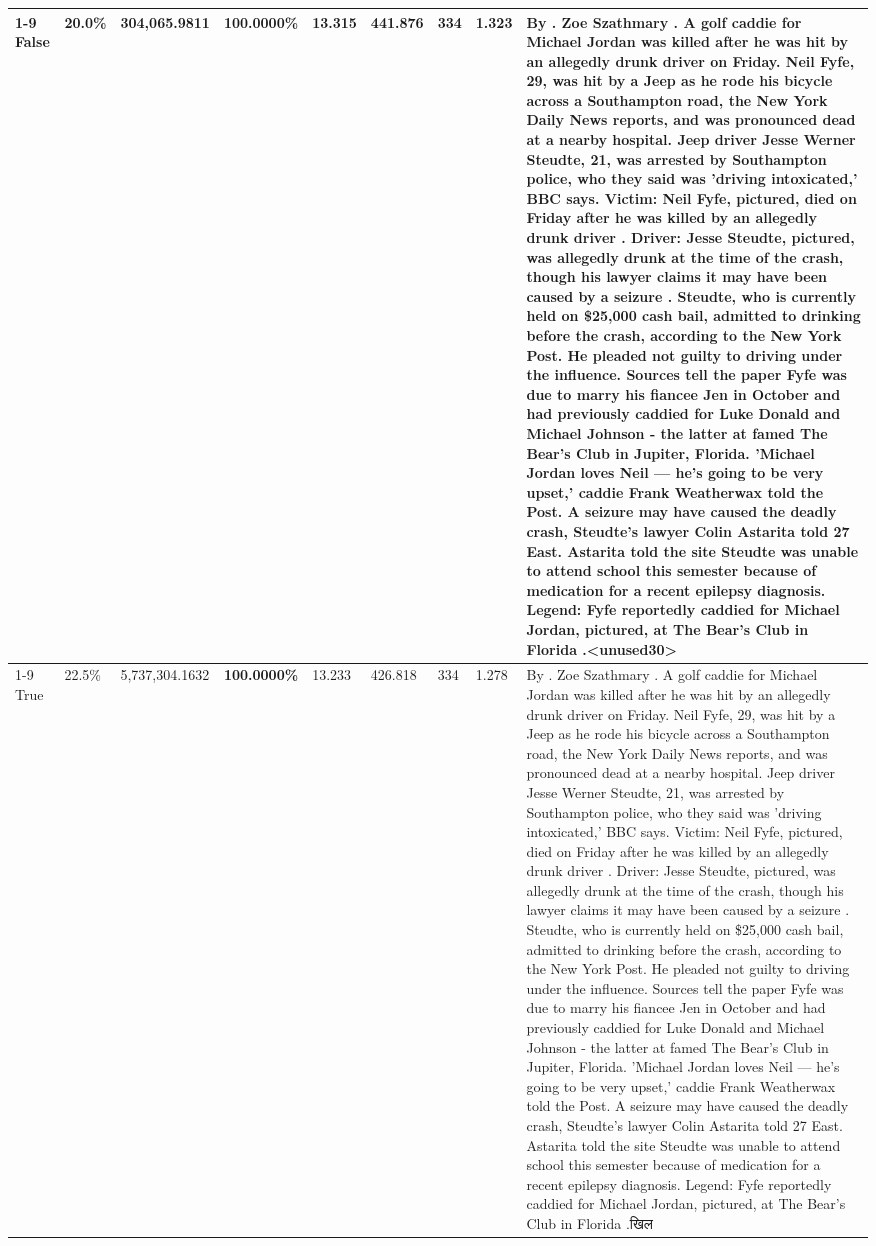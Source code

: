 \begin{table}[H]
\begin{tabular}{lllrlllll}
\cline{1-9}
False & 20.0\% & 304,065.9811 & \bfseries \color{red} 100.0000\% & 13.315 & 441.876 & 334 & 1.323 & By . Zoe Szathmary . A golf caddie for Michael Jordan was killed after he was hit by an allegedly drunk driver on Friday. Neil Fyfe, 29, was hit by a Jeep as he rode his bicycle across a Southampton road, the New York Daily News reports, and was pronounced dead at a nearby hospital. Jeep driver Jesse Werner Steudte, 21, was arrested by Southampton police, who they said was 'driving intoxicated,' BBC says. Victim: Neil Fyfe, pictured, died on Friday after he was killed by an allegedly drunk driver . Driver: Jesse Steudte, pictured, was allegedly drunk at the time of the crash, though his lawyer claims it may have been caused by a seizure . Steudte, who is currently held on \$25,000 cash bail, admitted to drinking before the crash, according to the New York Post. He pleaded not guilty to driving under the influence. Sources tell the paper Fyfe was due to marry his fiancee Jen in October and had previously caddied for Luke Donald and Michael Johnson - the latter at famed The Bear's Club in Jupiter, Florida. 'Michael Jordan loves Neil — he’s going to be very upset,' caddie Frank Weatherwax told the Post. A seizure may have caused the deadly crash, Steudte's lawyer Colin Astarita told 27 East. Astarita told the site Steudte was unable to attend school this semester because of medication for a recent epilepsy diagnosis. Legend: Fyfe reportedly caddied for Michael Jordan, pictured, at The Bear's Club in Florida .<unused30> \\
\cline{1-9}
True & 22.5\% & 5,737,304.1632 & \bfseries \color{red} 100.0000\% & 13.233 & 426.818 & 334 & 1.278 & By . Zoe Szathmary . A golf caddie for Michael Jordan was killed after he was hit by an allegedly drunk driver on Friday. Neil Fyfe, 29, was hit by a Jeep as he rode his bicycle across a Southampton road, the New York Daily News reports, and was pronounced dead at a nearby hospital. Jeep driver Jesse Werner Steudte, 21, was arrested by Southampton police, who they said was 'driving intoxicated,' BBC says. Victim: Neil Fyfe, pictured, died on Friday after he was killed by an allegedly drunk driver . Driver: Jesse Steudte, pictured, was allegedly drunk at the time of the crash, though his lawyer claims it may have been caused by a seizure . Steudte, who is currently held on \$25,000 cash bail, admitted to drinking before the crash, according to the New York Post. He pleaded not guilty to driving under the influence. Sources tell the paper Fyfe was due to marry his fiancee Jen in October and had previously caddied for Luke Donald and Michael Johnson - the latter at famed The Bear's Club in Jupiter, Florida. 'Michael Jordan loves Neil — he’s going to be very upset,' caddie Frank Weatherwax told the Post. A seizure may have caused the deadly crash, Steudte's lawyer Colin Astarita told 27 East. Astarita told the site Steudte was unable to attend school this semester because of medication for a recent epilepsy diagnosis. Legend: Fyfe reportedly caddied for Michael Jordan, pictured, at The Bear's Club in Florida .खिल \\

\end{tabular}
\end{table}
